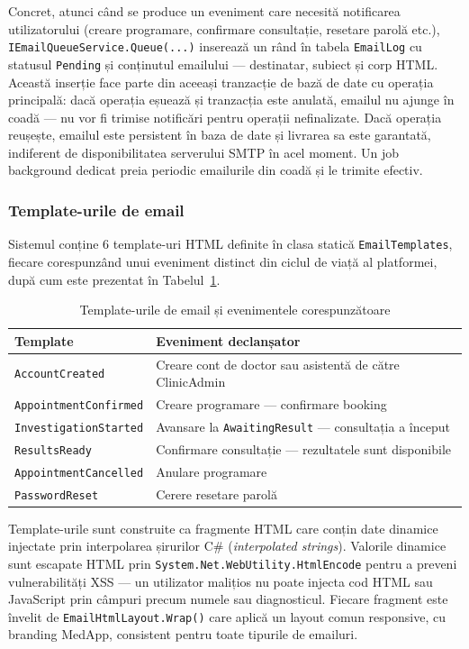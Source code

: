 \documentclass[12pt, a4paper]{report}
\begin{document}
Concret, atunci când se produce un eveniment care necesită notificarea utilizatorului
(creare programare, confirmare consultație, resetare parolă etc.),
\texttt{IEmailQueueService.Queue(...)} inserează un rând în tabela \texttt{EmailLog}
cu statusul \texttt{Pending} și conținutul emailului --- destinatar, subiect și corp
HTML. Această inserție face parte din aceeași tranzacție de bază de date cu operația
principală: dacă operația eșuează și tranzacția este anulată, emailul nu ajunge în
coadă --- nu vor fi trimise notificări pentru operații nefinalizate. Dacă operația
reușește, emailul este persistent în baza de date și livrarea sa este garantată,
indiferent de disponibilitatea serverului SMTP în acel moment. Un job background
dedicat preia periodic emailurile din coadă și le trimite efectiv.



\subsubsection{Template-urile de email}

Sistemul conține 6 template-uri HTML definite în clasa statică
\texttt{EmailTemplates}, fiecare corespunzând unui eveniment distinct din ciclul
de viață al platformei, după cum este prezentat în
Tabelul~\ref{tab:email-templates}.

\begin{table}[H]
\centering
\caption{Template-urile de email și evenimentele corespunzătoare}
\label{tab:email-templates}
\begin{tabular}{|l|l|}
\hline
\textbf{Template} & \textbf{Eveniment declanșator} \\
\hline
\texttt{AccountCreated}        & Creare cont de doctor sau asistentă de către ClinicAdmin \\
\texttt{AppointmentConfirmed}  & Creare programare --- confirmare booking \\
\texttt{InvestigationStarted}  & Avansare la \texttt{AwaitingResult} --- consultația a început \\
\texttt{ResultsReady}          & Confirmare consultație --- rezultatele sunt disponibile \\
\texttt{AppointmentCancelled}  & Anulare programare \\
\texttt{PasswordReset}         & Cerere resetare parolă \\
\hline
\end{tabular}
\end{table}

Template-urile sunt construite ca fragmente HTML care conțin date dinamice injectate
prin interpolarea șirurilor C\# (\textit{interpolated strings}). Valorile dinamice
sunt escapate HTML prin \texttt{System.Net.WebUtility.HtmlEncode} pentru a preveni
vulnerabilități XSS --- un utilizator malițios nu poate injecta cod HTML sau
JavaScript prin câmpuri precum numele sau diagnosticul. Fiecare fragment este
învelit de \texttt{EmailHtmlLayout.Wrap()} care aplică un layout comun responsive,
cu branding MedApp, consistent pentru toate tipurile de emailuri.
\end{document}
